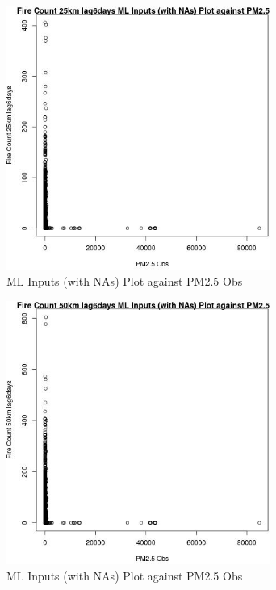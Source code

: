 \begin{figure} 
\centering  
\includegraphics[width=0.77\textwidth]{Code_Outputs/Report_ML_input_PM25_Step4_part_f_de_duplicated_aves_prioritize_24hr_obswNAs_Fire_Count_25km_lag6daysvPM25_Obs.jpg} 
\caption{\label{fig:Report_ML_input_PM25_Step4_part_f_de_duplicated_aves_prioritize_24hr_obswNAsFire_Count_25km_lag6daysvPM25_Obs}ML Inputs (with NAs) Plot against PM2.5 Obs} 
\end{figure} 
 

\begin{figure} 
\centering  
\includegraphics[width=0.77\textwidth]{Code_Outputs/Report_ML_input_PM25_Step4_part_f_de_duplicated_aves_prioritize_24hr_obswNAs_Fire_Count_50km_lag6daysvPM25_Obs.jpg} 
\caption{\label{fig:Report_ML_input_PM25_Step4_part_f_de_duplicated_aves_prioritize_24hr_obswNAsFire_Count_50km_lag6daysvPM25_Obs}ML Inputs (with NAs) Plot against PM2.5 Obs} 
\end{figure} 
 

